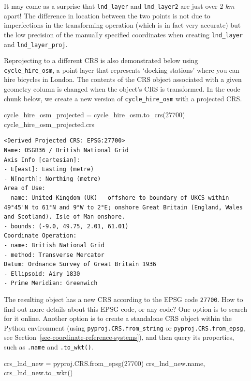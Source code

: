 \documentclass[
  letterpaper,
]{krantz}
\newenvironment{Shaded}{\begin{snugshade}}{\end{snugshade}}
\newcommand{\DecValTok}[1]{\textcolor[rgb]{0.68,0.00,0.00}{#1}}
\newcommand{\NormalTok}[1]{\textcolor[rgb]{0.00,0.23,0.31}{#1}}
\newcommand{\OperatorTok}[1]{\textcolor[rgb]{0.37,0.37,0.37}{#1}}
\begin{document}
It may come as a surprise that \texttt{lnd\_layer} and
\texttt{lnd\_layer2} are just over 2 \(km\) apart! The difference in
location between the two points is not due to imperfections in the
transforming operation (which is in fact very accurate) but the low
precision of the manually specified coordinates when creating
\texttt{lnd\_layer} and \texttt{lnd\_layer\_proj}.

Reprojecting to a different CRS is also demonstrated below using
\texttt{cycle\_hire\_osm}, a point layer that represents `docking
stations' where you can hire bicycles in London. The contents of the CRS
object associated with a given geometry column is changed when the
object's CRS is transformed. In the code chunk below, we create a new
version of \texttt{cycle\_hire\_osm} with a projected CRS.

\begin{Shaded}
\begin{Highlighting}[]
\NormalTok{cycle\_hire\_osm\_projected }\OperatorTok{=}\NormalTok{ cycle\_hire\_osm.to\_crs(}\DecValTok{27700}\NormalTok{)}
\NormalTok{cycle\_hire\_osm\_projected.crs}
\end{Highlighting}
\end{Shaded}

\begin{verbatim}
<Derived Projected CRS: EPSG:27700>
Name: OSGB36 / British National Grid
Axis Info [cartesian]:
- E[east]: Easting (metre)
- N[north]: Northing (metre)
Area of Use:
- name: United Kingdom (UK) - offshore to boundary of UKCS within 49°45'N to 61°N and 9°W to 2°E; onshore Great Britain (England, Wales and Scotland). Isle of Man onshore.
- bounds: (-9.0, 49.75, 2.01, 61.01)
Coordinate Operation:
- name: British National Grid
- method: Transverse Mercator
Datum: Ordnance Survey of Great Britain 1936
- Ellipsoid: Airy 1830
- Prime Meridian: Greenwich
\end{verbatim}

The resulting object has a new CRS according to the EPSG code
\texttt{27700}. How to find out more details about this EPSG code, or
any code? One option is to search for it online. Another option is to
create a standalone CRS object within the Python environment (using
\texttt{pyproj.CRS.from\_string} or \texttt{pyproj.CRS.from\_epsg}, see
Section~\ref{sec-coordinate-reference-systems}), and then query its
properties, such as \texttt{.name} and \texttt{.to\_wkt()}.

\begin{Shaded}
\begin{Highlighting}[]
\NormalTok{crs\_lnd\_new }\OperatorTok{=}\NormalTok{ pyproj.CRS.from\_epsg(}\DecValTok{27700}\NormalTok{)}
\NormalTok{crs\_lnd\_new.name, crs\_lnd\_new.to\_wkt()}
\end{Highlighting}
\end{Shaded}
\end{document}

